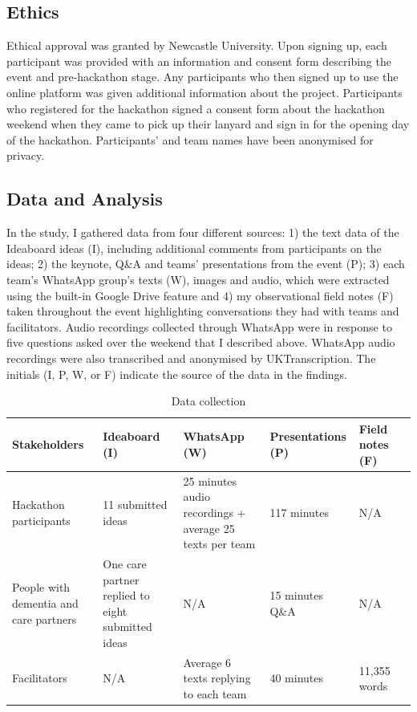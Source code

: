 \subsection{Ethics}
\label{sec:Ethics}
Ethical approval was granted by Newcastle University. Upon signing up, each participant was provided with an information and consent form describing the event and pre-hackathon stage. Any participants who then signed up to use the online platform was given additional information about the project. Participants who registered for the hackathon signed a consent form about the hackathon weekend when they came to pick up their lanyard and sign in for the opening day of the hackathon. Participants’ and team names have been anonymised for privacy.

\subsection{Data and Analysis}
\label{sec:DataAnalysis}
In the study, I gathered data from four different sources: 1) the text data of the Ideaboard ideas (I), including additional comments from participants on the ideas; 2) the keynote, Q\&A and teams’ presentations from the event (P); 3) each team’s WhatsApp group’s texts (W), images and audio, which were extracted using the built-in Google Drive feature and 4) my observational field notes (F) taken throughout the event highlighting conversations they had with teams and facilitators. Audio recordings collected through WhatsApp were in response to five questions asked over the weekend that I described above. WhatsApp audio recordings were also transcribed and anonymised by UKTranscription. The initials (I, P, W, or F) indicate the source of the data in the findings.

\begin{table}[ht]
\begin{tabularx}{\textwidth}{@{} Y|YYYYY @{}}
\textbf{Stakeholders} & \textbf{Ideaboard (I)} & \textbf{WhatsApp (W)} & \textbf{Presentations (P)} & \textbf{Field notes (F)} \\ \hline
Hackathon participants & 11 submitted ideas & 25 minutes audio recordings + average 25 texts per team & 117 minutes & N/A \\
People with dementia and care partners & One care partner replied to eight submitted ideas & N/A & 15 minutes Q\&A & N/A \\
Facilitators & N/A & Average 6 texts replying to each team & 40 minutes & 11,355 words \\
\end{tabularx}
\caption{Data collection}
\label{table:data collection}
\end{table}


